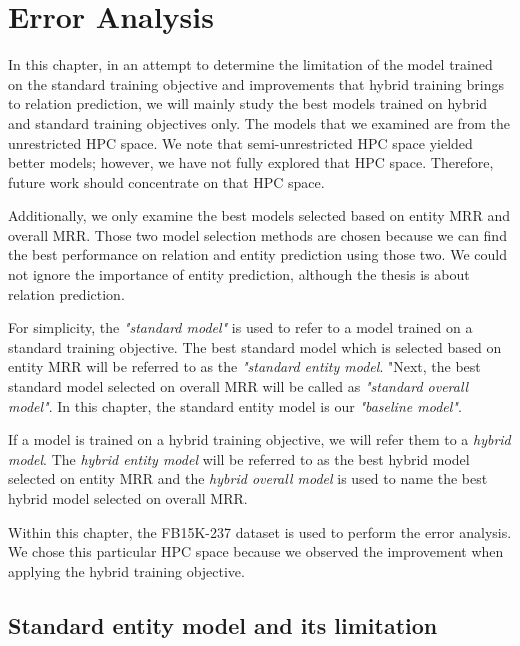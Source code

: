 \chapter{Error Analysis}

In this chapter, in an attempt to determine the limitation of the model trained on the standard training objective and improvements that hybrid training brings to relation prediction, we will mainly study the best models trained on hybrid and standard training objectives only. The models that we examined are from the unrestricted HPC space. We note that semi-unrestricted HPC space yielded better models; however, we have not fully explored that HPC space. Therefore, future work should concentrate on that HPC space.

Additionally, we only examine the best models selected based on entity MRR and overall MRR. Those two model selection methods are chosen because we can find the best performance on relation and entity prediction using those two. We could not ignore the importance of entity prediction, although the thesis is about relation prediction. 

For simplicity, the \textit{"standard model"} is used to refer to a model trained on a standard training objective. The best standard model which is selected based on entity MRR will be referred to as the \textit{"standard entity model}. "Next, the best standard model selected on overall MRR will be called as \textit{"standard overall model"}. In this chapter, the standard entity model is our \textit{"baseline model"}.

If a model is trained on a hybrid training objective, we will refer them to a \textit{hybrid model}. The \textit{hybrid entity model} will be referred to as the best hybrid model selected on entity MRR and the \textit{hybrid overall model} is used to name the best hybrid model selected on overall MRR. 

Within this chapter, the FB15K-237 dataset is used to perform the error analysis. We chose this particular HPC space because we observed the improvement when applying the hybrid training objective. 

\section{Standard entity model and its limitation}

